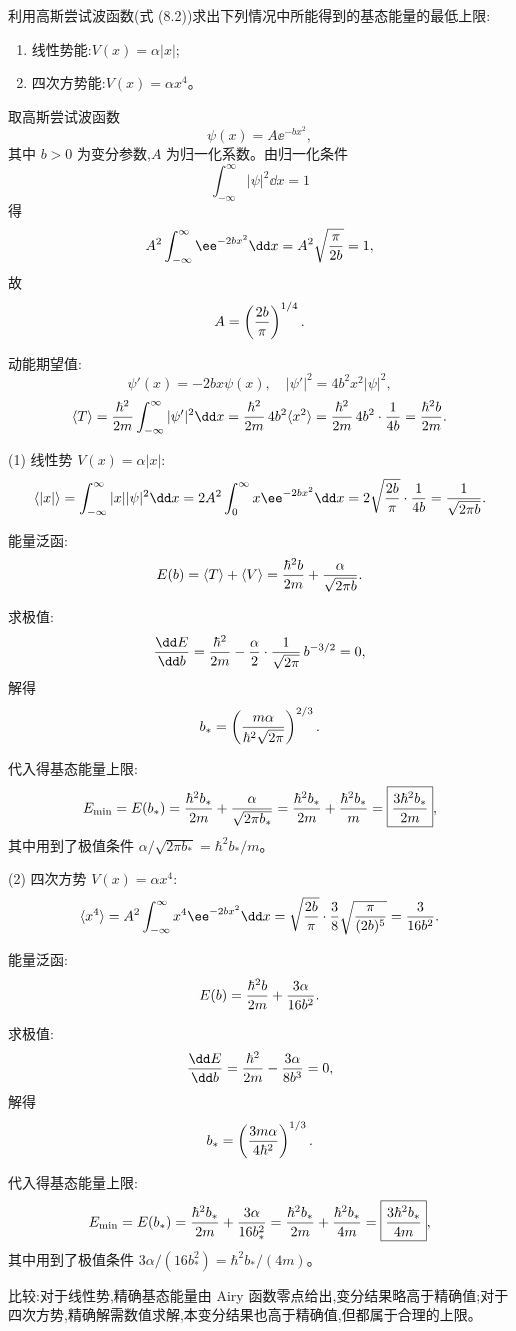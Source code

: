 \begin{question}
利用高斯尝试波函数(式 (8.2))求出下列情况中所能得到的基态能量的最低上限:
\begin{enumerate}
\item 线性势能:$V(x)=\alpha |x|$;
\item 四次方势能:$V(x)=\alpha x^4$。
\end{enumerate}

\par\smallskip
{}

\begin{solution}
取高斯尝试波函数
\[
\psi(x)=A \ee^{-b x^2},
\]
其中 $b>0$ 为变分参数,$A$ 为归一化系数。由归一化条件
\[
\int_{-\infty}^\infty|\psi|^2\dd x=1
\]
得
\[
A^2\int_{-\infty}^\infty \ee^{-2b x^2}\dd x
=A^2\sqrt{\pi\over2b}=1,
\]
故
\[
A=\left({2b\over\pi}\right)^{1/4}.
\]

动能期望值:
\[
\psi'(x)=-2b x\psi(x),\quad |\psi'|^2=4b^2x^2|\psi|^2,
\]
\[
\langle T\rangle={\hbar^2\over2m}\int_{-\infty}^\infty|\psi'|^2\dd x
={\hbar^2\over2m}\,4b^2\langle x^2\rangle
={\hbar^2\over2m}\,4b^2\cdot{1\over4b}
={\hbar^2 b\over2m}.
\]

(1) 线性势 $V(x)=\alpha|x|$:
\[
\langle |x|\rangle = \int_{-\infty}^\infty|x||\psi|^2\dd x
=2A^2\int_0^\infty x \ee^{-2b x^2}\dd x
=2\sqrt{2b\over\pi}\cdot{1\over4b}
={1\over\sqrt{2\pi b}}.
\]

能量泛函:
\[
E(b)=\langle T\rangle+\langle V\rangle
={\hbar^2 b\over2m}+{\alpha\over\sqrt{2\pi b}}.
\]

求极值:
\[
{\dd E\over\dd b}={\hbar^2\over2m}-{\alpha\over2}\cdot{1\over\sqrt{2\pi}}\,b^{-3/2}=0,
\]
解得
\[
b_*=\left({m\alpha\over\hbar^2\sqrt{2\pi}}\right)^{2/3}.
\]

代入得基态能量上限:
\[
E_{\min}=E(b_*)={\hbar^2 b_*\over2m}+{\alpha\over\sqrt{2\pi b_*}}
={\hbar^2 b_*\over2m}+{\hbar^2 b_*\over m}
=\boxed{{3\hbar^2 b_*\over2m}},
\]
其中用到了极值条件 $\alpha/\sqrt{2\pi b_*}=\hbar^2 b_*/m$。

(2) 四次方势 $V(x)=\alpha x^4$:
\[
\langle x^4\rangle = A^2\int_{-\infty}^\infty x^4 \ee^{-2b x^2}\dd x
=\sqrt{2b\over\pi}\cdot{3\over8}\sqrt{\pi\over(2b)^5}
={3\over16b^2}.
\]

能量泛函:
\[
E(b)={\hbar^2 b\over2m}+{3\alpha\over16b^2}.
\]

求极值:
\[
{\dd E\over\dd b}={\hbar^2\over2m}-{3\alpha\over8b^3}=0,
\]
解得
\[
b_*=\left({3m\alpha\over4\hbar^2}\right)^{1/3}.
\]

代入得基态能量上限:
\[
E_{\min}=E(b_*)={\hbar^2 b_*\over2m}+{3\alpha\over16b_*^2}
={\hbar^2 b_*\over2m}+{\hbar^2 b_*\over4m}
=\boxed{{3\hbar^2 b_*\over4m}},
\]
其中用到了极值条件 $3\alpha/(16b_*^2)=\hbar^2 b_*/(4m)$。

比较:对于线性势,精确基态能量由 Airy 函数零点给出,变分结果略高于精确值;对于四次方势,精确解需数值求解,本变分结果也高于精确值,但都属于合理的上限。
\end{solution}
\end{question}

